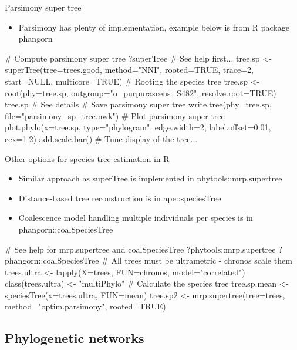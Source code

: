 \documentclass[compress, ucs, xelatex, 11pt, xcolor=x11names, aspectratio=169,
	hyperref={
		bookmarks=true,
		unicode=true,
		colorlinks=true,
		pdftitle={HybSeq course},
		plainpages=false,
		pdfauthor={Vojtech Zeisek},
		pdfsubject={Practical processing of HybSeq target enrichment sequencing data on computing grids like MetaCentrum},
		pdfcreator={XeLaTeX},
		pdfkeywords={BASH, command line, GNU, HybSeq, Linux, MetaCentrum, sequencing shell, target enrichment},
		linkcolor=Cyan2, %
		anchorcolor=Firebrick2, %
		citecolor=Firebrick2, %
		filecolor=Firebrick2, %
		menucolor=Firebrick2, %
		urlcolor=Chartreuse2, %
		pdftex},
	url={hyphens, lowtilde} %
	]{beamer}
\renewcommand{\texttt}[1]{\colorbox{Snow4}{{\ttfamily #1}}}
\begin{document}
\begin{frame}[fragile]{Parsimony super tree}
	\begin{itemize}
		\item Parsimony has plenty of implementation, example below is from \texttt{R} package \texttt{phangorn}
	\end{itemize}
	\begin{spluscode}
    # Compute parsimony super tree
    ?superTree # See help first...
    tree.sp <- superTree(tree=trees.good, method="NNI", rooted=TRUE,
      trace=2, start=NULL, multicore=TRUE)
    # Rooting the species tree
    tree.sp <- root(phy=tree.sp, outgroup="o_purpurascens_S482",
      resolve.root=TRUE)
    tree.sp # See details
    # Save parsimony super tree
    write.tree(phy=tree.sp, file="parsimony_sp_tree.nwk")
    # Plot parsimony super tree
    plot.phylo(x=tree.sp, type="phylogram", edge.width=2,
      label.offset=0.01, cex=1.2)
    add.scale.bar()
    # Tune display of the tree...
	\end{spluscode}
\end{frame}

\begin{frame}[fragile]{Other options for species tree estimation in R}
	\begin{itemize}
		\item Similar approach as \texttt{superTree} is implemented in \texttt{phytools::mrp.supertree}
		\item Distance-based tree reconstruction is in \texttt{ape::speciesTree}
		\item Coalescence model handling multiple individuals per species is in \texttt{phangorn::coalSpeciesTree}
	\end{itemize}
	\begin{spluscode}
    # See help for mrp.supertree and coalSpeciesTree
    ?phytools::mrp.supertree
    ?phangorn::coalSpeciesTree
    # All trees must be ultrametric - chronos scale them
    trees.ultra <- lapply(X=trees, FUN=chronos, model="correlated")
    class(trees.ultra) <- "multiPhylo"
    # Calculate the species tree
    tree.sp.mean <- speciesTree(x=trees.ultra, FUN=mean)
    tree.sp2 <- mrp.supertree(tree=trees, method="optim.parsimony",
      rooted=TRUE)
	\end{spluscode}
\end{frame}

\subsection{Phylogenetic networks}
\end{document}
